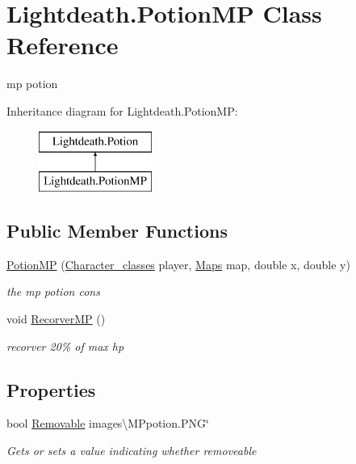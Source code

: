 \hypertarget{class_lightdeath_1_1_potion_m_p}{}\section{Lightdeath.\+Potion\+MP Class Reference}
\label{class_lightdeath_1_1_potion_m_p}


mp potion  


Inheritance diagram for Lightdeath.\+Potion\+MP\+:\begin{figure}[H]
\begin{center}
\leavevmode
\includegraphics[height=2.000000cm]{class_lightdeath_1_1_potion_m_p}
\end{center}
\end{figure}
\subsection*{Public Member Functions}
\begin{DoxyCompactItemize}
\item 
\hyperlink{class_lightdeath_1_1_potion_m_p_a18ee499fc8f0162794b0ab30c4186713}{Potion\+MP} (\hyperlink{class_lightdeath_1_1_character__classes}{Character\+\_\+classes} player, \hyperlink{class_lightdeath_1_1_maps}{Maps} map, double x, double y)
\begin{DoxyCompactList}\small\item\em the mp potion cons \end{DoxyCompactList}\item 
void \hyperlink{class_lightdeath_1_1_potion_m_p_a38b9d58b4619fc7070f0b49b41f42345}{Recorver\+MP} ()
\begin{DoxyCompactList}\small\item\em recorver 20\% of max hp \end{DoxyCompactList}\end{DoxyCompactItemize}
\subsection*{Properties}
\begin{DoxyCompactItemize}
\item 
bool \hyperlink{class_lightdeath_1_1_potion_m_p_adb0339b25613697955d479204c559c36}{Removable} images\textbackslash{}\+M\+Ppotion.\+P\+NG\char`\"{}
\begin{DoxyCompactList}\small\item\em Gets or sets a value indicating whether removeable \end{DoxyCompactList}\end{DoxyCompactItemize}


